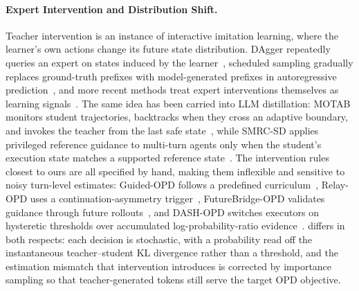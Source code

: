 \paragraph{Expert Intervention and Distribution Shift.}
Teacher intervention is an instance of interactive imitation learning, where the learner's own actions change its future state distribution.
DAgger repeatedly queries an expert on states induced by the learner~\citep{RossGB11}, scheduled sampling gradually replaces ground-truth prefixes with model-generated prefixes in autoregressive prediction~\citep{BengioVJS15}, and more recent methods treat expert interventions themselves as learning signals~\citep{LuoDZ0L24}.
The same idea has been carried into LLM distillation: MOTAB monitors student trajectories, backtracks when they cross an adaptive boundary, and invokes the teacher from the last safe state~\citep{abs-2605-19433}, while SMRC-SD applies privileged reference guidance to multi-turn agents only when the student's execution state matches a supported reference state~\citep{abs-2608-05219}.
The intervention rules closest to ours are all specified by hand, making them inflexible and sensitive to noisy turn-level estimates: Guided-OPD follows a predefined curriculum~\citep{abs-2606-15912}, Relay-OPD uses a continuation-asymmetry trigger~\citep{abs-2607-26057}, FutureBridge-OPD validates guidance through future rollouts~\citep{abs-2608-01953}, and DASH-OPD switches executors on hysteretic thresholds over accumulated log-probability-ratio evidence~\citep{abs-2607-29078}.
\name differs in both respects: each decision is stochastic, with a probability read off the instantaneous teacher--student KL divergence rather than a threshold, and the estimation mismatch that intervention introduces is corrected by importance sampling so that teacher-generated tokens still serve the target OPD objective.

